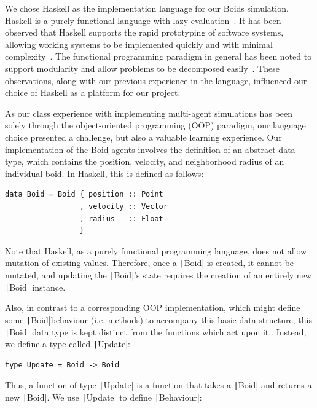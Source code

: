 We chose Haskell as the implementation language for our Boids simulation.
Haskell is a purely functional language with lazy evaluation~\cite{hudak1994haskell,jones2003haskell}. It has been observed that Haskell supports the rapid prototyping of software systems, allowing working systems to be implemented quickly and with minimal complexity~\cite{hudak1994haskell}. The functional programming paradigm in general has been noted to support modularity and allow problems to be decomposed easily~\cite{hughes1989functional}. These observations, along with our previous experience in the language, influenced our choice of Haskell as a platform for our project.

As our class experience with implementing multi-agent simulations has been solely through the object-oriented programming (OOP) paradigm, our language choice presented a challenge, but also a valuable learning experience. Our
implementation of the Boid agents involves the definition of an abstract data
type, which contains the position, velocity, and neighborhood radius of an
individual boid. In Haskell, this is defined as follows:
\begin{listing}[h!]
\begin{verbatim}
data Boid = Boid { position :: Point
                 , velocity :: Vector
                 , radius   :: Float
                 }
\end{verbatim}
\end{listing}
\FloatBarrier
Note that Haskell, as a purely functional programming language, does not allow mutation of existing values. Therefore, once a
\texttt|Boid| is created, it cannot be mutated, and updating the \texttt|Boid|'s state
requires the creation of an entirely new \texttt|Boid| instance.

Also, in contrast to a corresponding OOP implementation, which might define some \texttt|Boid|behaviour (i.e. methods) to accompany this basic data structure, this \texttt|Boid| data type is kept distinct from the functions which act upon it.. Instead, we define a type called \texttt|Update|:

\begin{verbatim}
type Update = Boid -> Boid
\end{verbatim}

Thus, a function of type \texttt|Update| is a function that takes a \texttt|Boid| and returns
a new \texttt|Boid|. We use \texttt|Update| to define \texttt|Behaviour|:

